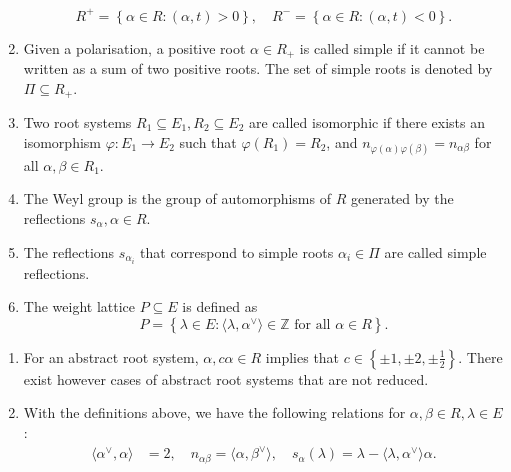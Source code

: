 \documentclass{report}
\begin{document}
\begin{definition}
\begin{enumerate}
        \[
        R^+ = \left\{ \alpha \in R : (\alpha, t) > 0 \right\}, \quad R^- = \left\{ \alpha \in R : (\alpha, t) < 0 \right\}.
        \]
        \item Given a polarisation, a positive root $\alpha \in R_+$ is called simple if it cannot be written as a sum of two positive roots.
        The set of simple roots is denoted by $\Pi \subseteq R_+$.
        \item Two root systems $R_1 \subseteq E_1, R_2 \subseteq E_2$ are called isomorphic if there exists an isomorphism $\varphi: E_1 \to E_2$ such that $\varphi(R_1) = R_2$, and $n_{\varphi(\alpha) \varphi(\beta)} = n_{\alpha \beta}$ for all $\alpha, \beta \in R_1$.
        \item The Weyl group is the group of automorphisms of $R$ generated by the reflections $s_\alpha, \alpha \in R$.
        \item The reflections $s_{\alpha_i}$ that correspond to simple roots $\alpha_i \in \Pi$ are called simple reflections.
        \item The weight lattice $P\subseteq E$ is defined as
        \[
        P = \left\{ \lambda \in E : \langle \lambda, \alpha^\vee \rangle \in \mathbb Z \text{ for all } \alpha \in R \right\}.
        \]
    \end{enumerate}
\end{definition}

\begin{remark}
    \begin{enumerate}[label = (\roman*)]
        \item For an abstract root system, $\alpha, c \alpha \in R$ implies that $c \in \left\{ \pm 1, \pm 2, \pm \frac{1}{2} \right\}$.
        There exist however cases of abstract root systems that are not reduced.
        \item With the definitions above, we have the following relations for $\alpha, \beta \in R, \lambda \in E$:
        \begin{align*}
            \langle \alpha^\vee,  \alpha \rangle &= 2,\quad n_{\alpha \beta} = \langle\alpha, \beta^\vee \rangle, \quad s_\alpha(\lambda) = \lambda - \langle \lambda, \alpha^\vee \rangle \alpha.
        \end{align*}
    \end{enumerate}
\end{remark}
\end{document}
